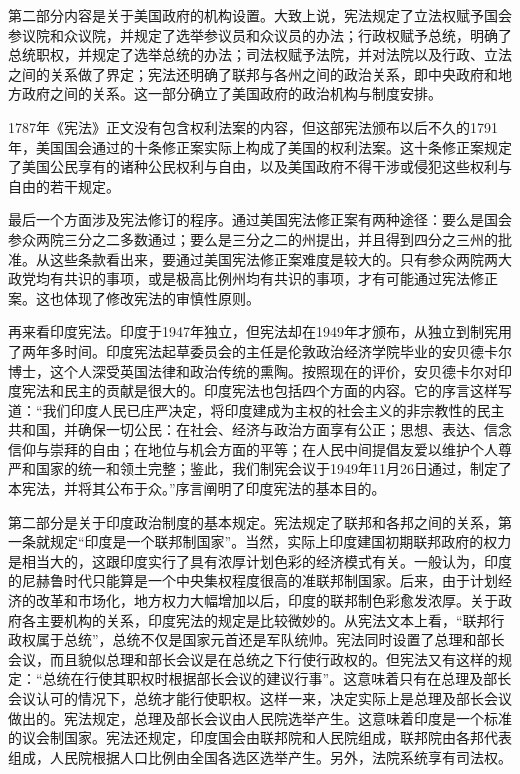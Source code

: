 第二部分内容是关于美国政府的机构设置。大致上说，宪法规定了立法权赋予国会参议院和众议院，并规定了选举参议员和众议员的办法；行政权赋予总统，明确了总统职权，并规定了选举总统的办法；司法权赋予法院，并对法院以及行政、立法之间的关系做了界定；宪法还明确了联邦与各州之间的政治关系，即中央政府和地方政府之间的关系。这一部分确立了美国政府的政治机构与制度安排。

1787年《宪法》正文没有包含权利法案的内容，但这部宪法颁布以后不久的1791年，美国国会通过的十条修正案实际上构成了美国的权利法案。这十条修正案规定了美国公民享有的诸种公民权利与自由，以及美国政府不得干涉或侵犯这些权利与自由的若干规定。

最后一个方面涉及宪法修订的程序。通过美国宪法修正案有两种途径：要么是国会参众两院三分之二多数通过；要么是三分之二的州提出，并且得到四分之三州的批准。从这些条款看出来，要通过美国宪法修正案难度是较大的。只有参众两院两大政党均有共识的事项，或是极高比例州均有共识的事项，才有可能通过宪法修正案。这也体现了修改宪法的审慎性原则。

再来看印度宪法。印度于1947年独立，但宪法却在1949年才颁布，从独立到制宪用了两年多时间。印度宪法起草委员会的主任是伦敦政治经济学院毕业的安贝德卡尔博士，这个人深受英国法律和政治传统的熏陶。按照现在的评价，安贝德卡尔对印度宪法和民主的贡献是很大的。印度宪法也包括四个方面的内容。它的序言这样写道：“我们印度人民已庄严决定，将印度建成为主权的社会主义的非宗教性的民主共和国，并确保一切公民：在社会、经济与政治方面享有公正；思想、表达、信念信仰与崇拜的自由；在地位与机会方面的平等；在人民中间提倡友爱以维护个人尊严和国家的统一和领土完整；鉴此，我们制宪会议于1949年11月26日通过，制定了本宪法，并将其公布于众。”序言阐明了印度宪法的基本目的。

第二部分是关于印度政治制度的基本规定。宪法规定了联邦和各邦之间的关系，第一条就规定“印度是一个联邦制国家”。当然，实际上印度建国初期联邦政府的权力是相当大的，这跟印度实行了具有浓厚计划色彩的经济模式有关。一般认为，印度的尼赫鲁时代只能算是一个中央集权程度很高的准联邦制国家。后来，由于计划经济的改革和市场化，地方权力大幅增加以后，印度的联邦制色彩愈发浓厚。关于政府各主要机构的关系，印度宪法的规定是比较微妙的。从宪法文本上看，“联邦行政权属于总统”，总统不仅是国家元首还是军队统帅。宪法同时设置了总理和部长会议，而且貌似总理和部长会议是在总统之下行使行政权的。但宪法又有这样的规定：“总统在行使其职权时根据部长会议的建议行事”。这意味着只有在总理及部长会议认可的情况下，总统才能行使职权。这样一来，决定实际上是总理及部长会议做出的。宪法规定，总理及部长会议由人民院选举产生。这意味着印度是一个标准的议会制国家。宪法还规定，印度国会由联邦院和人民院组成，联邦院由各邦代表组成，人民院根据人口比例由全国各选区选举产生。另外，法院系统享有司法权。

